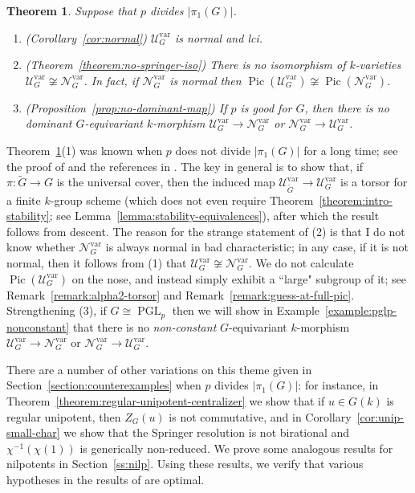 \documentclass[11pt,reqno]{amsart}
\newtheorem{theorem}{Theorem}[section]
\theoremstyle{definition}
\renewcommand{\rm}{\mathrm}
\newcommand{\sN}{{\mathscr N}}
\newcommand{\sU}{{\mathscr U}}
\DeclareMathOperator{\Pic}{Pic}
\DeclareMathOperator{\PGL}{PGL}
\begin{document}
\begin{theorem}\label{theorem:intro-no-springer-iso}
    Suppose that $p$ divides $|\pi_1(G)|$.
    \begin{enumerate}
        \item (Corollary~\ref{cor:normal}) $\sU_G^{\rm{var}}$ is normal and lci.
        \item (Theorem~\ref{theorem:no-springer-iso}) There is no isomorphism of $k$-varieties $\sU_G^{\rm{var}} \not\cong \sN_G^{\rm{var}}$. In fact, if $\sN_G^{\rm{var}}$ is normal then $\Pic(\sU_G^{\rm{var}}) \not\cong \Pic(\sN_G^{\rm{var}})$.
        \item (Proposition~\ref{prop:no-dominant-map}) If $p$ is good for $G$, then there is no dominant $G$-equivariant $k$-morphism $\sU_G^{\rm{var}} \to \sN_G^{\rm{var}}$ or $\sN_G^{\rm{var}} \to \sU_G^{\rm{var}}$.
    \end{enumerate}
\end{theorem}

Theorem~\ref{theorem:intro-no-springer-iso}(1) was known when $p$ does not divide $|\pi_1(G)|$ for a long time; see the proof of \cite[Lemma 4.4]{Integral-Springer} and the references in \cite[Lemma 4.1]{Integral-Springer}. The key in general is to show that, if $\pi\colon \widetilde{G} \to G$ is the universal cover, then the induced map $\sU_{\widetilde{G}}^{\rm{var}} \to \sU_G^{\rm{var}}$ is a torsor for a finite $k$-group scheme (which does not even require Theorem~\ref{theorem:intro-stability}; see Lemma~\ref{lemma:stability-equivalences}), after which the result follows from descent. The reason for the strange statement of (2) is that I do not know whether $\sN_G^{\rm{var}}$ is always normal in bad characteristic; in any case, if it is not normal, then it follows from (1) that $\sU_G^{\rm{var}} \not\cong \sN_G^{\rm{var}}$. We do not calculate $\Pic(\sU_G^{\rm{var}})$ on the nose, and instead simply exhibit a ``large" subgroup of it; see Remark~\ref{remark:alpha2-torsor} and Remark~\ref{remark:guess-at-full-pic}. Strengthening (3), if $G \cong \PGL_p$ then we will show in Example~\ref{example:pglp-nonconstant} that there is no \textit{non-constant} $G$-equivariant $k$-morphism $\sU_G^{\rm{var}} \to \sN_G^{\rm{var}}$ or $\sN_G^{\rm{var}} \to \sU_G^{\rm{var}}$.

There are a number of other variations on this theme given in Section~\ref{section:counterexamples} when $p$ divides $|\pi_1(G)|$: for instance, in Theorem~\ref{theorem:regular-unipotent-centralizer} we show that if $u \in G(k)$ is regular unipotent, then $Z_G(u)$ is not commutative, and in Corollary~\ref{cor:unip-small-char} we show that the Springer resolution is not birational and $\chi^{-1}(\chi(1))$ is generically non-reduced. We prove some analogous results for nilpotents in Section~\ref{ss:nilp}. Using these results, we verify that various hypotheses in the results of \cite{Integral-Springer} are optimal.
\end{document}
